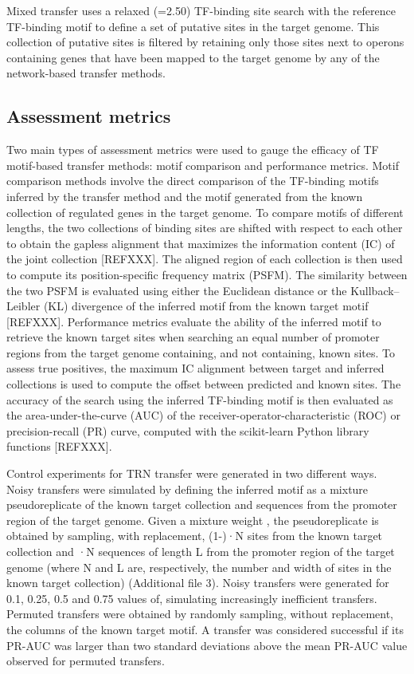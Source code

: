 Mixed transfer uses a relaxed (=2.50) TF-binding site search with the reference
TF-binding motif to define a set of putative sites in the target genome. This
collection of putative sites is filtered by retaining only those sites next to
operons containing genes that have been mapped to the target genome by any of
the network-based transfer methods.

\subsection{Assessment metrics}

Two main types of assessment metrics were used to gauge the efficacy of TF
motif-based transfer methods: motif comparison and performance metrics. Motif
comparison methods involve the direct comparison of the TF-binding motifs
inferred by the transfer method and the motif generated from the known
collection of regulated genes in the target genome. To compare motifs of
different lengths, the two collections of binding sites are shifted with
respect to each other to obtain the gapless alignment that maximizes the
information content (IC) of the joint collection [REFXXX]. The aligned region
of each collection is then used to compute its position-specific frequency
matrix (PSFM). The similarity between the two PSFM is evaluated using either
the Euclidean distance or the Kullback–Leibler (KL) divergence of the inferred
motif from the known target motif [REFXXX]. Performance metrics evaluate the
ability of the inferred motif to retrieve the known target sites when searching
an equal number of promoter regions from the target genome containing, and not
containing, known sites. To assess true positives, the maximum IC alignment
between target and inferred collections is used to compute the offset between
predicted and known sites. The accuracy of the search using the inferred
TF-binding motif is then evaluated as the area-under-the-curve (AUC) of the
receiver-operator-characteristic (ROC) or precision-recall (PR) curve, computed
with the scikit-learn Python library functions [REFXXX].

Control experiments for TRN transfer were generated in two different
ways. Noisy transfers were simulated by defining the inferred motif as a
mixture pseudoreplicate of the known target collection and sequences from the
promoter region of the target genome. Given a mixture weight , the
pseudoreplicate is obtained by sampling, with replacement, (1-)·N sites from
the known target collection and ·N sequences of length L from the promoter
region of the target genome (where N and L are, respectively, the number and
width of sites in the known target collection) (Additional file 3). Noisy
transfers were generated for 0.1, 0.25, 0.5 and 0.75 values of, simulating
increasingly inefficient transfers. Permuted transfers were obtained by
randomly sampling, without replacement, the columns of the known target
motif. A transfer was considered successful if its PR-AUC was larger than two
standard deviations above the mean PR-AUC value observed for permuted
transfers.
